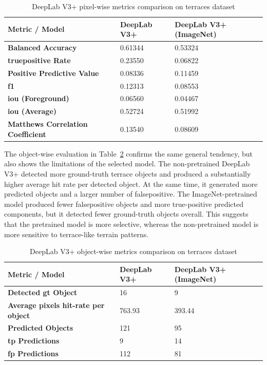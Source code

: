 \begin{table}[H]
    \centering
    \caption{DeepLab V3+ pixel-wise metrics comparison on terraces dataset}
    \begin{tabular}{|l|ll|}
    \hline
        \textbf{Metric / Model} & \textbf{DeepLab V3+} & \textbf{DeepLab V3+ (ImageNet)} \\ \hline
        \textbf{Balanced Accuracy} & 0.61344 & 0.53324 \\
        \textbf{\gls{truepositive} Rate} & 0.23550 & 0.06822 \\
        \textbf{Positive Predictive Value} & 0.08336 & 0.11459 \\
        \textbf{\gls{f1}} & 0.12313 & 0.08553 \\
        \textbf{\gls{iou} (Foreground)} & 0.06560 & 0.04467 \\
        \textbf{\gls{iou} (Average)} & 0.52724 & 0.51992 \\
        \textbf{Matthews Correlation Coefficient} & 0.13540 & 0.08609 \\ \hline
    \end{tabular}
    \label{tab:slovakia_v3_v3plus_metrics}
\end{table}

The object-wise evaluation in Table~\ref{tab:slovakia_v3plus_object_metrics} confirms the same general tendency, but also shows the limitations of the selected model. The non-pretrained DeepLab V3+ detected more ground-truth terrace objects and produced a substantially higher average hit rate per detected object. At the same time, it generated more predicted objects and a larger number of \gls{falsepositive}. The ImageNet-pretrained model produced fewer \gls{falsepositive} objects and more true-positive predicted components, but it detected fewer ground-truth objects overall. This suggests that the pretrained model is more selective, whereas the non-pretrained model is more sensitive to terrace-like terrain patterns.

\begin{table}[H]
    \centering
    \caption{DeepLab V3+ object-wise metrics comparison on terraces dataset}
    \begin{tabular}{|l|ll|}
    \hline
        \textbf{Metric / Model} & \textbf{DeepLab V3+} & \textbf{DeepLab V3+ (ImageNet)} \\ \hline
        \textbf{Detected \gls{gt} Object} & 16 & 9 \\
        \textbf{Average pixels hit-rate per object} & 763.93 & 393.44 \\
        \textbf{Predicted Objects} & 121 & 95 \\
        \textbf{\gls{tp} Predictions} & 9 & 14 \\
        \textbf{\gls{fp} Predictions} & 112 & 81 \\ \hline
    \end{tabular}
    \label{tab:slovakia_v3plus_object_metrics}
\end{table}

